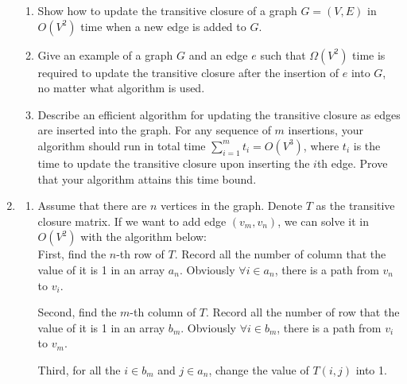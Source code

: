 \documentclass[12pt,a4paper]{article}
\makeatletter
\newtheorem*{solution}{Solution}
\theoremstyle{definition}
\renewenvironment{solution}[1][Solution] {\par\pushQED{\qed}\normalfont\topsep6\p@\@plus6\p@\relax\trivlist\item[\hskip\labelsep\bfseries#1\@addpunct{.}]\ignorespaces}{\popQED\endtrivlist\@endpefalse} \makeatother
\makeatother
\begin{document}
\begin{enumerate}
	\begin{enumerate}
	    \item Show how to update the transitive closure of a graph $G=(V,E)$ in $O(V^2)$ time when a new edge is added to $G$.
	    \item Give an example of a graph $G$ and an edge $e$ such that $\Omega(V^2)$ time is required to update the transitive closure after the insertion of $e$ into $G$, no matter what algorithm is used.
	    \item Describe an efficient algorithm for updating the transitive closure as edges are inserted into the graph. For any sequence of $m$ insertions, your algorithm should run in total time $\sum_{i=1}^m t_i=O(V^3)$, where $t_i$ is the time to update the transitive closure upon inserting the $i$th edge. Prove that your algorithm attains this time bound.
	\end{enumerate}
	
	\begin{solution}
		\begin{enumerate}
			\item Assume that there are $ n $ vertices in the graph. Denote $ T $ as the transitive closure matrix. If we want to add edge $ (v_{m}, v_{n}) $, we can solve it in $ O(V^2) $ with the algorithm below:\\
			
			First, find the $ n $-th row of $ T $. Record all the number of column that the value of it is 1 in an array $ a_{n} $. Obviously $ \forall i \in a_{n} $, there is a path from $ v_{n} $ to $ v_{i} $.
			
			Second, find the $ m $-th column of $ T $. Record all the number of row that the value of it is 1 in an array $ b_{m} $. Obviously $ \forall i \in b_{m} $, there is a path from $ v_{i} $ to $ v_{m} $.

			Third, for all the $ i \in b_{m} $ and $ j \in a_{n} $, change the value of $ T(i,j) $ into 1.\\


\end{enumerate}
\end{solution}
\end{enumerate}
\end{document}
